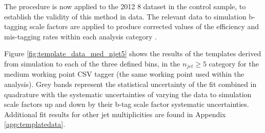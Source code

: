 The procedure is now applied to the 2012 8 \TeV dataset in the \mupjets control sample, to establish the validity of this method in data. The relevant data to simulation b-tagging scale factors are applied to produce corrected values of the efficiency and mis-tagging rates within each analysis category \cite{btagscalefactor}. 

Figure \ref{fig:template_data_med_njet5} shows the results of the templates derived from simulation to each of the three defined \theht bins, in the $n_{jet} \geq 5$ category for the medium working point \ac{CSV} tagger (the same working point used within the \alphat analysis).  Grey bands represent the statistical uncertainty of the fit combined in quadrature with the systematic uncertainties of varying the data to simulation scale factors up and down by their b-tag scale factor systematic uncertainties.  Additional fit results for other jet multiplicities are found in Appendix \ref{app:templatedata}.


